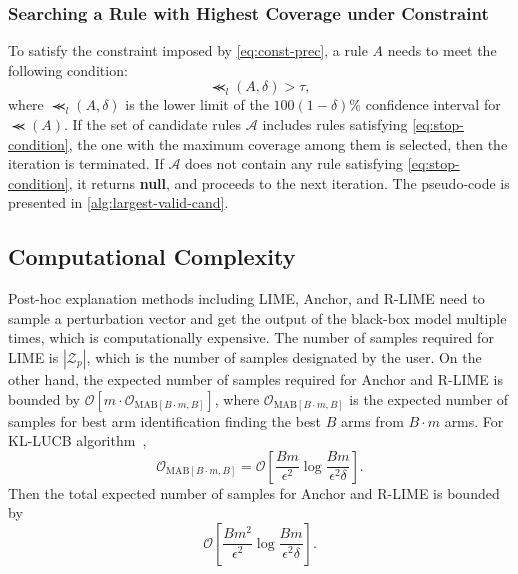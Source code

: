 \documentclass[runningheads]{llncs}
\begin{document}
{\subsubsection{Searching a Rule with Highest Coverage under Constraint}
To satisfy the constraint imposed by \cref{eq:const-prec},
a rule $A$ needs to meet the following condition:
\begin{equation}
  \Prec_{l}(A,\delta)>\tau,\label{eq:stop-condition}
\end{equation}
where $\Prec_{l}(A,\delta)$ is the lower limit of
the $100(1-\delta)$\% confidence interval for $\Prec(A)$.
If the set of candidate rules $\mathcal{A}$
includes rules satisfying \cref{eq:stop-condition},
the one with the maximum coverage among them is selected,
then the iteration is terminated.
If $\mathcal{A}$ does not contain any rule satisfying \cref{eq:stop-condition},
it returns \textbf{null},
and proceeds to the next iteration.
The pseudo-code is presented in \cref{alg:largest-valid-cand}.


\subsection{Computational Complexity}\label{subsec:complexity}
Post-hoc explanation methods including LIME, Anchor, and R-LIME
need to sample a perturbation vector
and get the output of the black-box model multiple times,
which is computationally expensive.
The number of samples required for LIME is $|\mathcal{Z}_p|$,
which is the number of samples designated by the user.
On the other hand,
the expected number of samples required for Anchor and R-LIME is bounded by
$\mathcal{O}[m\cdot\mathcal{O}_{\mathrm{MAB}[B\cdot m,B]}]$,
where $\mathcal{O}_{\mathrm{MAB}[B\cdot m,B]}$
is the expected number of samples
for best arm identification finding the best $B$ arms from $B\cdot m$ arms.
For KL-LUCB algorithm~\cite{kaufmann2013information},
\begin{equation}
  \mathcal{O}_{\mathrm{MAB}[B\cdot m,B]}=
  \mathcal{O}\left[\frac{Bm}{\epsilon^2}\log\frac{Bm}{\epsilon^2\delta}\right].
\end{equation}
Then the total expected number of samples for Anchor and R-LIME is bounded by
\begin{equation}
  \mathcal{O}\left[\frac{Bm^2}{\epsilon^2}\log\frac{Bm}{\epsilon^2\delta}\right].
\end{equation}

}
\end{document}
